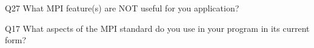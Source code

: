 \begin{description}%
\item{Q27} What MPI feature(s) are NOT useful for you application?%
\item{Q17} What aspects of the MPI standard do you use in your program in its current form?%
\end{description}%
